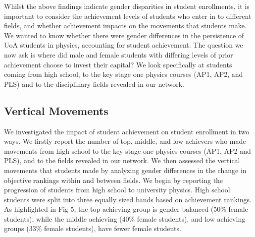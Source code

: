 Whilst the above findings indicate gender disparities in student enrollments, it is important to consider the achievement levels of students who enter in to different fields, and whether achievement impacts on the movements that students make. We wanted to know whether there were gender differences in the persistence of UoA students in physics, accounting for student achievement. The question we now ask is where did male and female students with differing levels of prior achievement choose to invest their capital? We look specifically at students coming from high school, to the key stage one physics courses (AP1, AP2, and PLS) and to the disciplinary fields revealed in our network. 

\subsection*{Vertical Movements}
We investigated the impact of student achievement on student enrollment in two ways. We firstly report the number of top, middle, and low achievers who made movements from high school to the key stage one physics courses (AP1, AP2 and PLS), and to the fields revealed in our network. We then assessed the vertical movements that students made by analyzing gender differences in the change in objective rankings within and between fields. We begin by reporting the progression of students from high school to university physics. High school students were split into three equally sized bands based on achievement rankings. As highlighted in Fig 5, the top achieving group is gender balanced (50\% female students), while the middle achieving (40\% female students), and low achieving groups (33\% female students), have fewer female students. 

